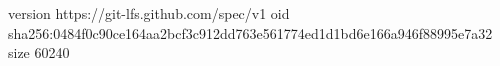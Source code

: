 version https://git-lfs.github.com/spec/v1
oid sha256:0484f0c90ce164aa2bcf3c912dd763e561774ed1d1bd6e166a946f88995e7a32
size 60240
